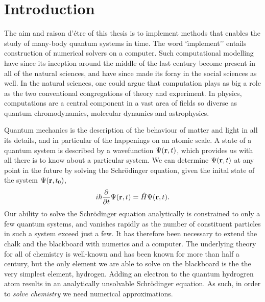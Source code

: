 \chapter{Introduction}

    The aim and raison d'étre of this thesis is to implement methods that enables the 
    study of many-body quantum systems in time. The word `ìmplement'' entails construction 
    of numerical solvers on a computer. Such computational modelling have since its 
    inception around the middle of the last century become present in all of the natural 
    sciences, and have since made its foray in the social sciences as well. In the 
    natural sciences, one could argue that computation plays as big a role as the two 
    conventional congregations of theory and experiment. In physics, computations are 
    a central component in a vast area of fields so diverse as
    quantum chromodynamics\cite{pederiva2018computing,vege2019solving},
    molecular dynamics\cite{stende2017constructing,treider2017speeding} and 
    astrophysics\cite{sand2016massive}.

    Quantum mechanics is the description of the behaviour of matter and light in all 
    its details, and in particular of the happenings on an atomic scale. A state of 
    a quantum system is described by a wavefunction $\Psi(\vb{r}, t)$, which provides 
    us with all there is to know about a particular system. We can determine
    $\Psi(\vb{r}, t)$
    at any point in the future by solving the Schrödinger equation, given the inital 
    state of the system $\Psi(\vb{r}, t_0)$,
    \begin{equation}
        i\hbar \frac{\partial}{\partial t} \Psi(\vb{r}, t) = \hat{H} \Psi(\vb{r}, t).
    \end{equation}
    Our ability to solve the Schrödinger equation analytically is constrained to only 
    a few quantum systems, and vanishes rapidly as the number of constituent particles in 
    such a system exceed just a few. It has therefore been necessary to extend the chalk and 
    the blackboard with numerics and a computer. The underlying theory for all of chemistry 
    is well-known and has been known for more than half a century, but the only element 
    we are able to solve on the blackboard is the the very simplest element, hydrogen.
    Adding an electron to the quantum hydrogren atom results in an analytically 
    unsolvable Schrödinger equation. As such, in order to \emph{solve chemistry} we 
    need numerical approximations.


